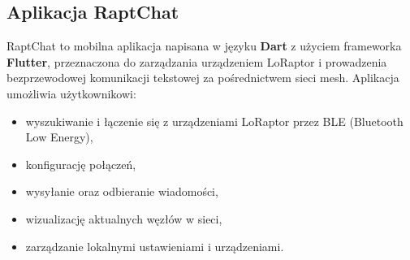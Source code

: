 \subsection{Aplikacja RaptChat}

RaptChat to mobilna aplikacja napisana w języku \textbf{Dart} z użyciem frameworka \textbf{Flutter}, przeznaczona do zarządzania urządzeniem LoRaptor i prowadzenia bezprzewodowej komunikacji tekstowej za pośrednictwem sieci mesh. Aplikacja umożliwia użytkownikowi:

\begin{itemize}
	\item wyszukiwanie i łączenie się z urządzeniami LoRaptor przez BLE (Bluetooth Low Energy),
	\item konfigurację połączeń,
	\item wysyłanie oraz odbieranie wiadomości,
	\item wizualizację aktualnych węzłów w sieci,
	\item zarządzanie lokalnymi ustawieniami i urządzeniami.
\end{itemize}

